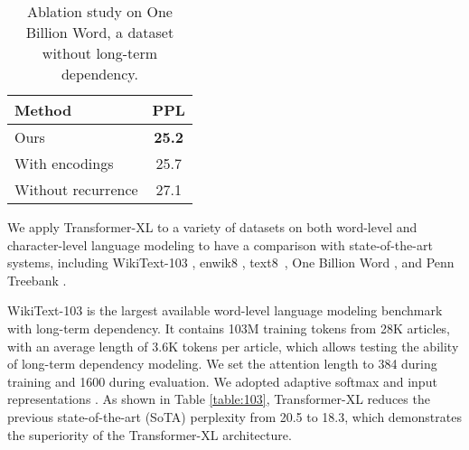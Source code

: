 \begin{table}[t]
    \small
    \centering
    \begin{tabular}{lc}
        \toprule
        \bf Method & \bf PPL \\
        \midrule
        Ours & \textbf{25.2} \\
        With \citet{shaw2018self} encodings & 25.7 \\
        Without recurrence & 27.1 \\
        \bottomrule
    \end{tabular}
    \caption{\small
        Ablation study on One Billion Word, a dataset without long-term dependency.
    }
    \label{table:ablation2}
\end{table}

We apply Transformer-XL to a variety of datasets on both word-level and character-level language modeling to have a comparison with state-of-the-art systems, including WikiText-103 \citep{merity2016pointer}, enwik8 \citep{mahoney2011large}, text8~\citep{mahoney2011large}, One Billion Word \citep{chelba2013one}, and Penn Treebank \citep{mikolov2012context}.

WikiText-103 is the largest available word-level language modeling benchmark with long-term dependency. It contains 103M training tokens from 28K articles, with an average length of 3.6K tokens per article, which allows testing the ability of long-term dependency modeling.
We set the attention length to 384 during training and 1600 during evaluation.
We adopted adaptive softmax and input representations \citep{baevski2018adaptive,grave2016efficient}.
As shown in Table \ref{table:103}, Transformer-XL reduces the previous state-of-the-art (SoTA) perplexity from 20.5 to 18.3, which demonstrates the superiority of the Transformer-XL architecture.

